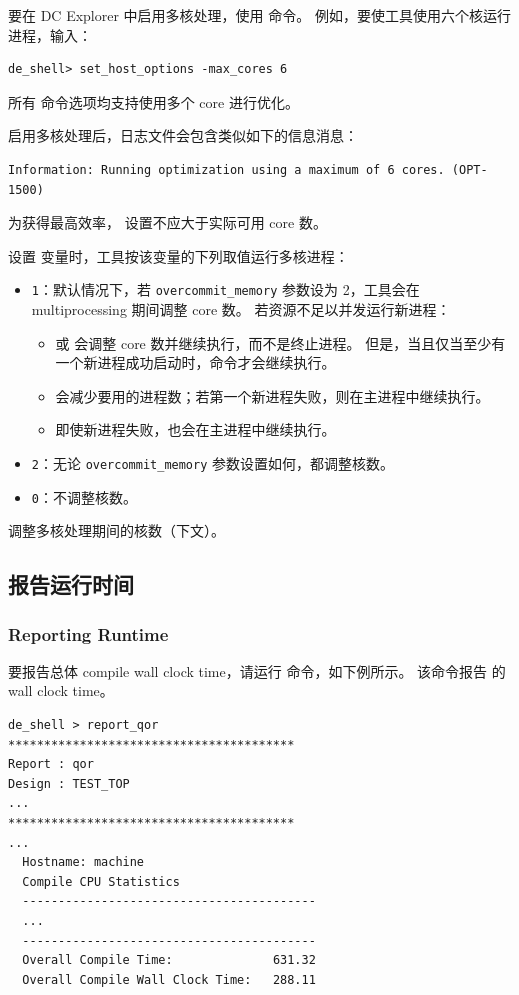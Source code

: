 要在 DC Explorer 中启用多核处理，使用  命令。
例如，要使工具使用六个核运行进程，输入：
\begin{lstlisting}
de_shell> set_host_options -max_cores 6
\end{lstlisting}
所有  命令选项均支持使用多个 core 进行优化。

启用多核处理后，日志文件会包含类似如下的信息消息：
\begin{lstlisting}
Information: Running optimization using a maximum of 6 cores. (OPT-1500)
\end{lstlisting}
为获得最高效率， 设置不应大于实际可用 core 数。

设置  变量时，工具按该变量的下列取值运行多核进程：
\begin{itemize}
  \item \texttt{1}：默认情况下，若 \texttt{overcommit\_memory} 参数设为 2，工具会在 multiprocessing 期间调整 core 数。
        若资源不足以并发运行新进程：
        \begin{itemize}
          \item {} 或  会调整 core 数并继续执行，而不是终止进程。
                但是，当且仅当至少有一个新进程成功启动时，命令才会继续执行。
          \item {} 会减少要用的进程数；若第一个新进程失败，则在主进程中继续执行。
          \item {} 即使新进程失败，也会在主进程中继续执行。
        \end{itemize}
  \item \texttt{2}：无论 \texttt{overcommit\_memory} 参数设置如何，都调整核数。
  \item \texttt{0}：不调整核数。
\end{itemize}

\begin{seeAlsoBox}
调整多核处理期间的核数（下文）。
\end{seeAlsoBox}

\subsection{报告运行时间}
\subsubsection*{Reporting Runtime}

要报告总体 compile wall clock time，请运行  命令，如下例所示。
该命令报告  的 wall clock time。
\begin{lstlisting}
de_shell > report_qor
****************************************
Report : qor
Design : TEST_TOP
...
****************************************
...
  Hostname: machine
  Compile CPU Statistics
  -----------------------------------------
  ...
  -----------------------------------------
  Overall Compile Time:              631.32
  Overall Compile Wall Clock Time:   288.11
\end{lstlisting}

